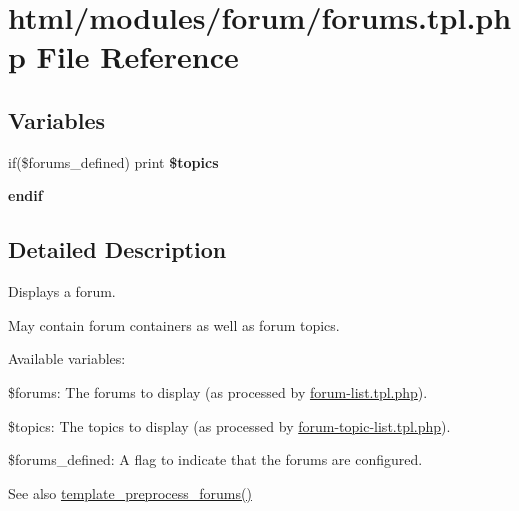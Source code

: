 \hypertarget{forums_8tpl_8php}{
\section{html/modules/forum/forums.tpl.php File Reference}
\label{forums_8tpl_8php}
}
\subsection*{Variables}
\begin{DoxyCompactItemize}
\item 
\hypertarget{forums_8tpl_8php_a078ef2c2e6e4d51307902362fbf15bb8}{
if(\$forums\_\-defined) print {\bfseries \$topics}}
\label{forums_8tpl_8php_a078ef2c2e6e4d51307902362fbf15bb8}

\item 
\hypertarget{forums_8tpl_8php_a82cd33ca97ff99f2fcc5e9c81d65251b}{
{\bfseries endif}}
\label{forums_8tpl_8php_a82cd33ca97ff99f2fcc5e9c81d65251b}

\end{DoxyCompactItemize}


\subsection{Detailed Description}
Displays a forum.

May contain forum containers as well as forum topics.

Available variables:
\begin{DoxyItemize}
\item \$forums: The forums to display (as processed by \hyperlink{forum-list_8tpl_8php}{forum-\/list.tpl.php}).
\item \$topics: The topics to display (as processed by \hyperlink{forum-topic-list_8tpl_8php}{forum-\/topic-\/list.tpl.php}).
\item \$forums\_\-defined: A flag to indicate that the forums are configured.
\end{DoxyItemize}

\begin{DoxySeeAlso}{See also}
\hyperlink{forum_8module_ad752c10d673b2b4e95fc5e3c9847dd24}{template\_\-preprocess\_\-forums()} 
\end{DoxySeeAlso}
